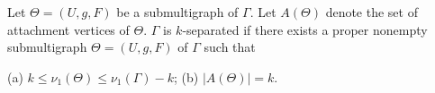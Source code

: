 Let $\Theta = (U, g, F)$ be a submultigraph of $\Gamma$. Let $A(\Theta)$ denote the set of attachment vertices of $\Theta$. $\Gamma$ is $k$-separated if there exists a proper nonempty submultigraph $\Theta = (U, g, F)$ of $\Gamma$ such that

(a) $k \leq \nu_1(\Theta) \leq \nu_1(\Gamma) - k$;
(b) $|A(\Theta)| = k$.

